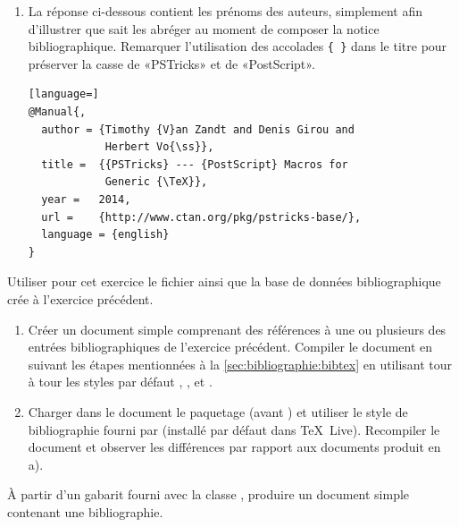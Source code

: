 \begin{exercice}
\begin{sol}
\begin{enumerate}
    \item La réponse ci-dessous contient les prénoms des auteurs,
      simplement afin d'illustrer que {\BibTeX} sait les abréger au
      moment de composer la notice bibliographique. Remarquer
      l'utilisation des accolades \verb={ }= dans le titre pour
      préserver la casse de «PSTricks» et de «PostScript».
\begin{lstlisting}[language=]
@Manual{,
  author = {Timothy {V}an Zandt and Denis Girou and
            Herbert Vo{\ss}},
  title =  {{PSTricks} --- {PostScript} Macros for
            Generic {\TeX}},
  year =   2014,
  url =    {http://www.ctan.org/pkg/pstricks-base/},
  language = {english}
}
\end{lstlisting}
    \end{enumerate}
  \end{sol}
\end{exercice}

\begin{exercice}[nosol]
  Utiliser pour cet exercice le fichier
   ainsi que la base de données
  bibliographique crée à l'exercice précédent.
  \begin{enumerate}
  \item Créer un document simple comprenant des références à une ou
    plusieurs des entrées bibliographiques de l'exercice précédent.
    Compiler le document en suivant les étapes mentionnées à la
    \autoref{sec:bibliographie:bibtex} en utilisant tour à tour les
    styles par défaut , ,  et
    .
  \item Charger dans le document le paquetage  (avant
    ) et utiliser le style de bibliographie 
    fourni par  (installé par défaut dans
    {\TeX}~Live). Recompiler le document et observer les différences
    par rapport aux documents produit en a).
  \end{enumerate}
\end{exercice}

\begin{exercice}[nosol]
  À partir d'un gabarit fourni avec la classe ,
  produire un document simple contenant une bibliographie.
\end{exercice}


